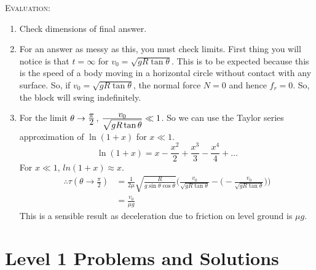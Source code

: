 \textsc{Evaluation:}
\begin{enumerate}
\item Check dimensions of final answer.
\item For an answer as messy as this, you must check limits. First thing you will notice is that $t=\infty$ for $v_0=\sqrt{gR\tan\theta}$. This is to be expected because this is the speed of a body moving in a horizontal circle without contact with any surface. So, if $v_0=\sqrt{gR\tan\theta}$, the normal force $N=0$ and hence $f_r=0$. So, the block will swing indefinitely. 
\item For the limit $\theta \to \frac{\displaystyle \pi}{\displaystyle 2}$, $\frac{\displaystyle v_0}{\displaystyle \sqrt{gR\tan\theta}} \ll 1$. So we can use the Taylor series approximation of $\ln(1+x)$ for $x \ll 1$.
\begin{equation}
\ln(1+x)=x-\frac{x^2}{2}+\frac{x^3}{3}-\frac{x^4}{4}+\dots \label{eq34}
\end{equation}
For $x\ll 1$, $ln(1+x) \approx x$.
\begin{align*}
\therefore \tau(\theta \to \frac{\pi}{2})&= \frac{1}{2\mu} \sqrt{\frac{R}{g\sin\theta\cos\theta}}\Biggl( \frac{v_0}{\sqrt{gR\tan\theta}}-\biggl( - \frac{v_0}{\sqrt{gR\tan\theta}} \biggr) \Biggr)\\
&= \frac{v_0}{\mu g}
\end{align*}
This is a sensible result as deceleration due to friction on level ground is $\mu g$.
\end{enumerate}

\section{Level 1 Problems and Solutions}

